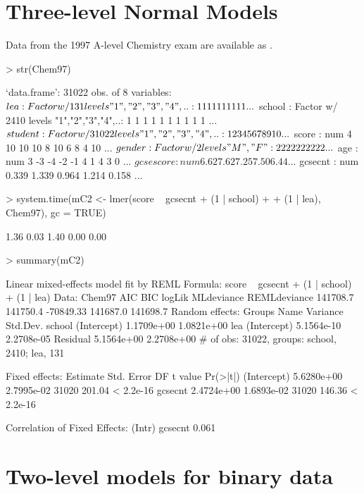 \documentclass[12pt]{article}
\begin{document}
\section{Three-level Normal Models}
\label{sec:three-level}
Data from the 1997 A-level Chemistry exam are available as .
\begin{Schunk}
\begin{Sinput}
> str(Chem97)
\end{Sinput}
\begin{Soutput}
`data.frame':	31022 obs. of  8 variables:
 $ lea      : Factor w/ 131 levels "1","2","3","4",..: 1 1 1 1 1 1 1 1 1 1 ...
 $ school   : Factor w/ 2410 levels "1","2","3","4",..: 1 1 1 1 1 1 1 1 1 1 ...
 $ student  : Factor w/ 31022 levels "1","2","3","4",..: 1 2 3 4 5 6 7 8 9 10 ...
 $ score    : num  4 10 10 10 8 10 6 8 4 10 ...
 $ gender   : Factor w/ 2 levels "M","F": 2 2 2 2 2 2 2 2 2 2 ...
 $ age      : num  3 -3 -4 -2 -1 4 1 4 3 0 ...
 $ gcsescore: num  6.62 7.62 7.25 7.50 6.44 ...
 $ gcsecnt  : num  0.339 1.339 0.964 1.214 0.158 ...
\end{Soutput}
\begin{Sinput}
> system.time(mC2 <- lmer(score ~ gcsecnt + (1 | school) + 
+     (1 | lea), Chem97), gc = TRUE)
\end{Sinput}
\begin{Soutput}
[1] 1.36 0.03 1.40 0.00 0.00
\end{Soutput}
\begin{Sinput}
> summary(mC2)
\end{Sinput}
\begin{Soutput}
Linear mixed-effects model fit by REML
Formula: score ~ gcsecnt + (1 | school) + (1 | lea) 
   Data: Chem97 
      AIC      BIC    logLik MLdeviance REMLdeviance
 141708.7 141750.4 -70849.33   141687.0     141698.7
Random effects:
 Groups   Name        Variance   Std.Dev.  
 school   (Intercept) 1.1709e+00 1.0821e+00
 lea      (Intercept) 5.1564e-10 2.2708e-05
 Residual             5.1564e+00 2.2708e+00
# of obs: 31022, groups: school, 2410; lea, 131

Fixed effects:
              Estimate Std. Error    DF t value  Pr(>|t|)
(Intercept) 5.6280e+00 2.7995e-02 31020  201.04 < 2.2e-16
gcsecnt     2.4724e+00 1.6893e-02 31020  146.36 < 2.2e-16

Correlation of Fixed Effects:
        (Intr)
gcsecnt 0.061 
\end{Soutput}
\end{Schunk}


\section{Two-level models for binary data}
\label{sec:TwolevelBinary}
\end{document}

